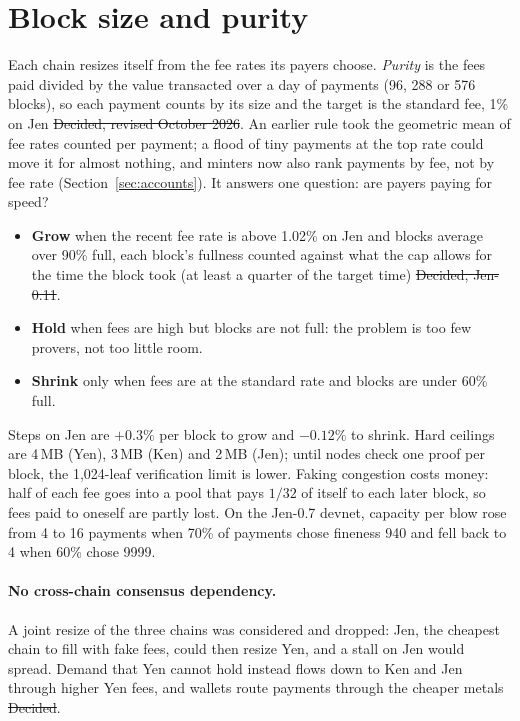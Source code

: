 \section{Block size and purity}\label{sec:purity}

Each chain resizes itself from the fee rates its payers choose. \emph{Purity} is the fees paid divided by the value transacted over a day of payments (96, 288 or 576 blocks), so each payment counts by its size and the target is the standard fee, 1\% on Jen \st{Decided, revised October 2026}. An earlier rule took the geometric mean of fee rates counted per payment; a flood of tiny payments at the top rate could move it for almost nothing, and minters now also rank payments by fee, not by fee rate (Section~\ref{sec:accounts}). It answers one question: are payers paying for speed?

\begin{itemize}
\item \textbf{Grow} when the recent fee rate is above 1.02\% on Jen and blocks average over 90\% full, each block's fullness counted against what the cap allows for the time the block took (at least a quarter of the target time) \st{Decided, Jen-0.11}.
\item \textbf{Hold} when fees are high but blocks are not full: the problem is too few provers, not too little room.
\item \textbf{Shrink} only when fees are at the standard rate and blocks are under 60\% full.
\end{itemize}

Steps on Jen are $+0.3\%$ per block to grow and $-0.12\%$ to shrink. Hard ceilings are 4\,MB (Yen), 3\,MB (Ken) and 2\,MB (Jen); until nodes check one proof per block, the 1,024-leaf verification limit is lower. Faking congestion costs money: half of each fee goes into a pool that pays $1/32$ of itself to each later block, so fees paid to oneself are partly lost. On the Jen-0.7 devnet, capacity per blow rose from 4 to 16 payments when 70\% of payments chose fineness 940 and fell back to 4 when 60\% chose 9999.

\paragraph{No cross-chain consensus dependency.} A joint resize of the three chains was considered and dropped: Jen, the cheapest chain to fill with fake fees, could then resize Yen, and a stall on Jen would spread. Demand that Yen cannot hold instead flows down to Ken and Jen through higher Yen fees, and wallets route payments through the cheaper metals \st{Decided}.

